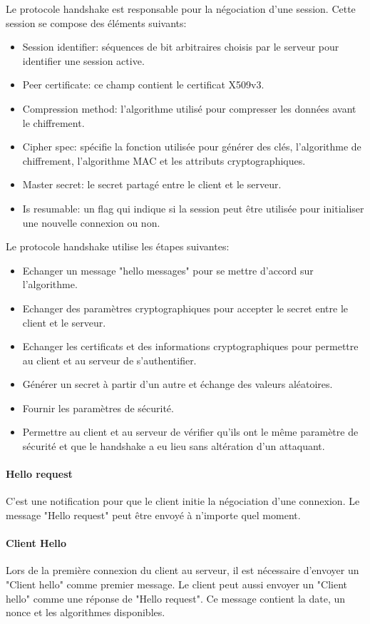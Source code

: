 Le protocole handshake est responsable pour la négociation d'une session.
Cette session se compose des éléments suivants:
\begin{itemize}
\item Session identifier: séquences de bit arbitraires choisis par le serveur pour identifier une session active.
\item Peer certificate: ce champ contient le certificat X509v3. 
\item Compression method: l'algorithme utilisé pour compresser les données avant le chiffrement.
\item Cipher spec: spécifie la fonction utilisée pour générer des clés, l'algorithme de chiffrement, l'algorithme MAC et les attributs cryptographiques.
\item Master secret: le secret partagé entre le client et le serveur.
\item Is resumable: un flag qui indique si la session peut être utilisée pour initialiser une nouvelle connexion ou non.\\
\end{itemize}
Le protocole handshake utilise les étapes suivantes:
\begin{itemize}
\item Echanger un message "hello messages" pour se mettre d'accord sur l'algorithme.
\item Echanger des paramètres cryptographiques pour accepter le secret entre le client et le serveur.
\item Echanger les certificats et des informations cryptographiques pour permettre au client et au serveur de s'authentifier. 
\item Générer un secret à partir d'un autre et échange des valeurs aléatoires.
\item Fournir les paramètres de sécurité.
\item Permettre au client et au serveur de vérifier qu'ils ont le même paramètre de sécurité et que le handshake a eu lieu sans altération d'un attaquant.
\end{itemize}
\paragraph{Hello request}
C'est une notification pour que le client initie la négociation d'une connexion.
Le message "Hello request" peut être envoyé à n'importe quel moment.
\paragraph{Client Hello}
Lors de la première connexion du client au serveur, il est nécessaire d'envoyer un "Client hello" comme premier message.
Le client peut aussi envoyer un "Client hello" comme une réponse de "Hello request".
Ce message contient la date, un nonce et les algorithmes disponibles.
